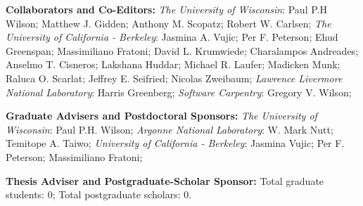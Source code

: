 \documentclass[svgnames,11pt]{article}
\begin{document}
\begin{bibsection}
    \item \textbf{Collaborators and Co-Editors:}
      \emph{The University of Wisconsin}:
            Paul P.H Wilson;
            Matthew J. Gidden;
            Anthony M. Scopatz;
            Robert W. Carlsen;
      \emph{The University of California - Berkeley}:
            Jasmina A. Vujic;
            Per F. Peterson;
            Ehud Greenspan;
            Massimiliano Fratoni;
            David L. Krumwiede;
            Charalampos Andreades;
            Anselmo T. Cisneros;
            Lakshana Huddar;
            Michael R. Laufer;
            Madicken Munk;
            Raluca O. Scarlat;
            Jeffrey E. Seifried;
            Nicolas Zweibaum;
      \emph{Lawrence Livermore National Laboratory}:
            Harris Greenberg;
      \emph{Software Carpentry}:
            Gregory V. Wilson;
    \item \textbf{Graduate Advisers and Postdoctoral Sponsors:}
        \emph{The University of Wisconsin}:
            Paul P.H. Wilson;
        \emph{Argonne National Laboratory}:
            W. Mark Nutt;
            Temitope A. Taiwo;
        \emph{University of California - Berkeley}:
            Jasmina Vujic;
            Per F. Peterson;
            Massimiliano Fratoni;
    \item \textbf{Thesis Adviser and Postgraduate-Scholar Sponsor:}
        Total graduate students: 0; Total postgraduate scholars: 0.

\end{bibsection}
\end{document}
